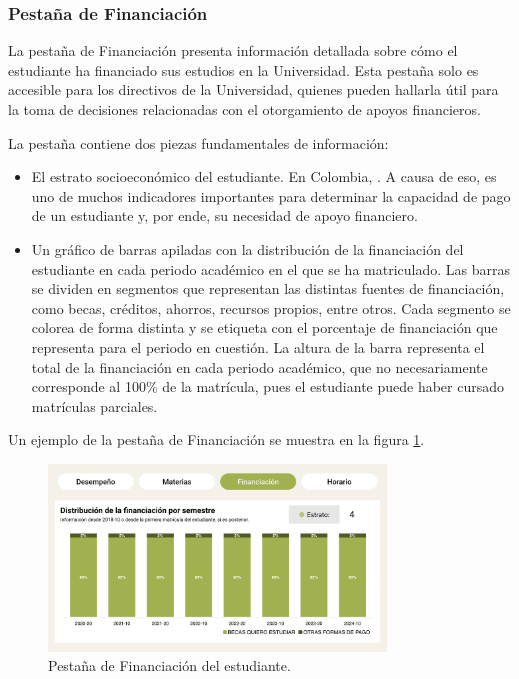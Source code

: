 \subsubsection{Pestaña de Financiación}

La pestaña de Financiación presenta información detallada sobre cómo el estudiante ha financiado sus estudios en la Universidad. Esta pestaña solo es accesible para los directivos de la Universidad, quienes pueden hallarla útil para la toma de decisiones relacionadas con el otorgamiento de apoyos financieros.

La pestaña contiene dos piezas fundamentales de información: 
\begin{itemize}
  \item El estrato socioeconómico del estudiante. En Colombia,  \cite{estrato}. A causa de eso, es uno de muchos indicadores importantes para determinar la capacidad de pago de un estudiante y, por ende, su necesidad de apoyo financiero.
  \item Un gráfico de barras apiladas con la distribución de la financiación del estudiante en cada periodo académico en el que se ha matriculado. Las barras se dividen en segmentos que representan las distintas fuentes de financiación, como becas, créditos, ahorros, recursos propios, entre otros. Cada segmento se colorea de forma distinta y se etiqueta con el porcentaje de financiación que representa para el periodo en cuestión. La altura de la barra representa el total de la financiación en cada periodo académico, que no necesariamente corresponde al 100\% de la matrícula, pues el estudiante puede haber cursado matrículas parciales.
\end{itemize}
Un ejemplo de la pestaña de Financiación se muestra en la figura \ref{fig:financiacion}.

\begin{figure}[H]
  \centering
  \includegraphics[width=0.8\textwidth]{img/nes/financiacion.png}
  \caption{Pestaña de Financiación del estudiante.}
  \label{fig:financiacion}
\end{figure}

